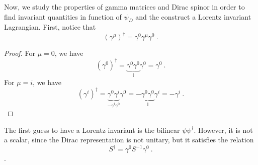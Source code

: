     Now, we study the properties of gamma matrices and Dirac spinor in order to find invariant quantities in function of $\psi_D$ and the construct a Lorentz invariant Lagrangian. First, notice that 
    \begin{equation}\label{gammadag}
        (\gamma^\mu)^\dagger = \gamma^0 \gamma^\mu \gamma^0 ~.
    \end{equation}
    \begin{proof}
        For $\mu = 0$, we have
        \begin{equation*}
            (\gamma^0)^\dagger = \underbrace{\gamma^0 \gamma^0}_{\mathbb I} \gamma^0 = \gamma^0 ~.
        \end{equation*}
        For $\mu = i$, we have 
        \begin{equation*}
            (\gamma^i)^\dagger = \underbrace{\gamma^0 \gamma^i}_{- \gamma^i \gamma^0} \gamma^0 = - \underbrace{\gamma^0 \gamma^0}_{\mathbb I} \gamma^i = - \gamma^i ~.
        \end{equation*}
    \end{proof}
    The first guess to have a Lorentz invariant is the bilinear $\psi \psi^\dagger$. However, it is not a scalar, since the Dirac representation is not unitary, but it satisfies the relation 
    \begin{equation*}
        S^\dagger = \gamma^0 S^{-1} \gamma^0 ~.
    \end{equation*}. 
